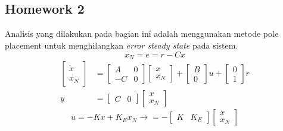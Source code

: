 \documentclass[../main.tex]{subfiles}
\begin{document}
        \subsection{Homework 2}
            Analisis yang dilakukan pada bagian ini adalah menggunakan metode pole placement untuk menghilangkan \textit{error steady state} pada sistem.
            \begin{equation}
                \dot{x_N} = e = r - Cx
            \end{equation}
            \begin{equation}
                \begin{split}
                    \begin{bmatrix} \dot{x} \\ \dot{x_N} \end{bmatrix} &= \begin{bmatrix} A & 0 \\ -C & 0 \end{bmatrix} \begin{bmatrix} x \\ x_N \end{bmatrix} + \begin{bmatrix} B \\ 0 \end{bmatrix} u + \begin{bmatrix} 0 \\ 1 \end{bmatrix} r \\[5pt]
                    y &= \begin{bmatrix} C & 0 \end{bmatrix} \begin{bmatrix} x \\ x_N \end{bmatrix}
                \end{split}
            \end{equation}
            \begin{equation}
                u = -Kx + K_E x_N \rightarrow = -\begin{bmatrix} K & K_E \end{bmatrix} \begin{bmatrix} x \\ x_N \end{bmatrix}
            \end{equation}
\end{document}
